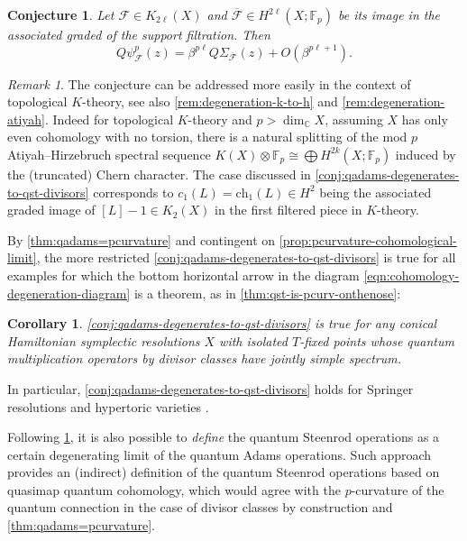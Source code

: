 \documentclass[reqno]{amsart}
\numberwithin{equation}{section}
\numberwithin{equation}{section}
\numberwithin{equation}{section}
\newtheorem{cor}[thm]{Corollary}
\newtheorem{conj}[thm]{Conjecture}
\theoremstyle{definition}
\theoremstyle{remark}
\theoremstyle{remark}
\newtheorem{rem}[thm]{Remark}
\begin{document}
\begin{conj}\label{conj:qadams-degenerates-to-qst}
    Let $\mathcal{F} \in K_{2\ell}(X)$ and $\overline{\mathcal{F}} \in H^{2\ell}(X;\mathbb{F}_p)$ be its image in the associated graded of the support filtration. Then
    \begin{equation}
        Q\psi_\mathcal{F}^p (z) = \beta^{p\ell} Q\Sigma_{\overline{\mathcal{F}}} (z) + O(\beta^{p\ell+1}).
    \end{equation}
\end{conj}

\begin{rem}
    The conjecture can be addressed more easily in the context of topological $K$-theory, see also \cref{rem:degeneration-k-to-h} and \cref{rem:degeneration-atiyah}. Indeed for topological $K$-theory and $p > \dim_{\mathbb{C}} X$, assuming $X$ has only even cohomology with no torsion, there is a natural splitting of the mod $p$ Atiyah--Hirzebruch spectral sequence $K(X) \otimes \mathbb{F}_p \cong \bigoplus H^{2k}(X;\mathbb{F}_p)$ induced by the (truncated) Chern character. The case discussed in \cref{conj:qadams-degenerates-to-qst-divisors} corresponds to $c_1(L) = \mathrm{ch}_1(L) \in H^2$ being the associated graded image of $[L]-1 \in K_2(X)$ in the first filtered piece in $K$-theory.
\end{rem}
    

By \cref{thm:qadams=pcurvature} and contingent on \cref{prop:pcurvature-cohomological-limit}, the more restricted \cref{conj:qadams-degenerates-to-qst-divisors} is true for all examples for which the bottom horizontal arrow in the diagram \cref{eqn:cohomology-degeneration-diagram} is a theorem, as in \cref{thm:qst-is-pcurv-onthenose}:

\begin{cor}\label{cor:qadams-degenerates-to-qst}
    \cref{conj:qadams-degenerates-to-qst-divisors} is true for any conical Hamiltonian symplectic resolutions $X$ with isolated $T$-fixed points whose quantum multiplication operators by divisor classes have jointly simple spectrum.
\end{cor}
In particular, \cref{conj:qadams-degenerates-to-qst-divisors} holds for Springer resolutions and hypertoric varieties \cite{Lee23b, bai-lee}.


Following \cref{conj:qadams-degenerates-to-qst}, it is also possible to \emph{define} the quantum Steenrod operations as a certain degenerating limit of the quantum Adams operations. Such approach provides an (indirect) definition of the quantum Steenrod operations based on quasimap quantum cohomology, which would agree with the $p$-curvature of the quantum connection in the case of divisor classes by construction and \cref{thm:qadams=pcurvature}.
\end{document}
